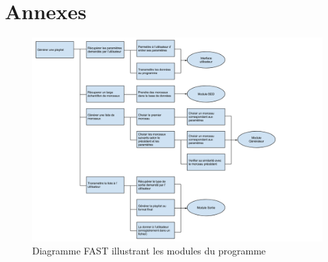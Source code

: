 \documentclass[11pt,a4paper]{article}
\begin{document}
\newpage
\section{Annexes}

\begin{figure}[!h]
\includegraphics[width=14cm]{fast.png}
\caption{Diagramme FAST illustrant les modules du programme}
\end{figure}
\end{document}
